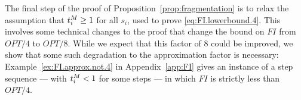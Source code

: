 
The final step of the proof of Proposition~\ref{prop:fragmentation} is to relax the assumption that $t^{M}_{i} \geq 1$ for all $s_i$, used to prove \eqref{eq:FI.lowerbound.4}.
%
This involves some technical changes to the proof that change the bound on $FI$ from $OPT/4$ to $OPT/8$.  While we expect that this factor of $8$ could be improved, we show that some such degradation to the approximation factor is necessary: Example~\ref{ex:FI.approx.not.4} in Appendix~\ref{app:FI} gives an instance of a step sequence --- with $t^{M}_{i} < 1$ for some steps --- in which $FI$ is strictly less than $OPT/4$.





